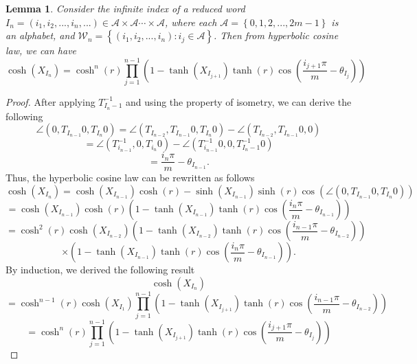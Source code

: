 \documentclass[12pt,oneside]{sfsuthesis}
\theoremstyle{plain} %
\newtheorem{lemma}[theorem]{Lemma}
\theoremstyle{definition}  %
\theoremstyle{remark}  %
\theoremstyle{plain}
\begin{document}
{\begin{lemma}
Consider the infinite index of a reduced word $I_n=(i_1,i_2,...,i_n,...)\in \mathcal{A}\times\mathcal{A}\cdots\times\mathcal{A}$, where each $\mathcal{A}=\left\lbrace 0,1,2,...,2m-1\right\rbrace$ is an alphabet, and $\mathcal{W}_n=\left\lbrace 
(i_1,i_2,...,i_n):i_j\in\mathcal{A}\right\rbrace$. 
Then from hyperbolic cosine law, we can have
$$
\cosh\left( X_{I_n}\right)=\cosh^n\left(r\right)\prod_{j=1}^{n-1}\left(1-\tanh\left(X_{I_{j+1}}\right)\tanh\left(r\right)\cos\left(\frac{i_{j+1}\pi}{m}-\theta_{I_j}\right)\right)
$$
\end{lemma}
\begin{proof}
After applying $T^{-1}_{I_n-1}$ and using the property of isometry, we can derive the following
$$
\angle\left(0,T_{I_{n-1}}0,T_{I_n}0\right)=\angle\left(T_{I_{n-2}},T_{I_{n-1}}0,T_{I_n}0\right)
-\angle\left(T_{I_{n-2}},T_{I_{n-1}}0,0\right)
$$
$$
=\angle\left(T^{-1}_{i_{n-1}},0,T_{i_n}0\right)-\angle\left(T^{-1}_{i_{n-1}}0,0,T^{-1}_{I_n-1}0\right)
$$
$$
=\frac{i_n\pi}{m}-\theta_{I_{n-1}}.
$$
Thus, the hyperbolic cosine law can be rewritten as follows
$$
\cosh\left( X_{I_n}\right)=\cosh\left( X_{I_{n-1}}\right)\cosh\left( r \right)
-\sinh\left( X_{I_{n-1}}\right)\sinh\left( r\right)\cos\left(\angle\left(0,T_{I_{n-1}}0,T_{I_n}0\right)\right)
$$
$$
=\cosh\left(X_{I_{n-1}}\right)\cosh\left( r\right)\left( 1- \tanh\left(X_{I_{n-1}}\right)\tanh\left(r\right)\cos\left( \frac{i_n\pi}{m}-\theta_{I_{n-1}}\right)\right)
$$
$$
=\cosh^2\left( r\right)\cosh\left(X_{I_{n-2}}\right)\left(1- \tanh\left(X_{I_{n-2}}\right)\tanh\left(r\right)\cos\left( \frac{i_{n-1}\pi}{m}-\theta_{I_{n-2}}\right)\right)
$$
$$
\times\left(1- \tanh\left(X_{I_{n-1}}\right)\tanh\left(r\right)\cos\left( \frac{i_n\pi}{m}-\theta_{I_{n-1}}\right)\right).
$$
By induction, we derived the following result
$$
\cosh\left( X_{I_n}\right)$$
$$=\cosh^{n-1}\left(r\right)\cosh\left(X_{I_{1}}\right)\prod_{j=1}^{n-1}\left( 1-\tanh\left(X_{I_{j+1}}\right)\tanh\left(r\right)\cos\left(\frac{i_{n-1}\pi}{m}-\theta_{I_{n-2}}\right)\right)
$$
$$
=\cosh^n\left(r\right)\prod_{j=1}^{n-1}\left(1-\tanh\left(X_{I_{j+1}}\right)\tanh\left(r\right)\cos\left(\frac{i_{j+1}\pi}{m}-\theta_{I_j}\right)\right)
$$
\end{proof}


}
\end{document}
